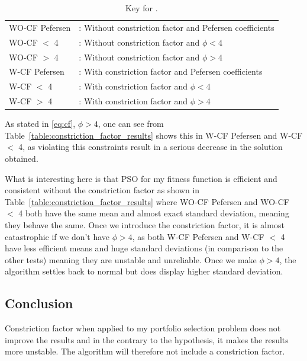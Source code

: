 \documentclass{pdfmx4020}
\begin{document}
        \begin{table}[H]
          \setlength{\extrarowheight}{2.0pt}
          \begin{tabular}{ l l }
            WO-CF Pefersen & : Without constriction factor and Pefersen coefficients  \\
            WO-CF $<$ 4 & : Without constriction factor and $\phi < 4$ \\
            WO-CF $>$ 4 & : Without constriction factor and $\phi > 4$ \\
            W-CF Pefersen & : With constriction factor and Pefersen coefficients  \\
            W-CF $<$ 4 & : With constriction factor and $\phi < 4$ \\
            W-CF $>$ 4 & : With constriction factor and $\phi > 4$ \\
          \end{tabular}
          \caption{Key for .}
          \label{table:key_constriction_factor_results}
        \end{table}

      As stated in \ref{eq:cf}, $\phi > 4$, one can see from Table~\ref{table:constriction_factor_results} shows this in W-CF Pefersen and W-CF $<$ 4, as violating this constraints result in a serious decrease in the solution obtained. 

      What is interesting here is that PSO for my fitness function is efficient and consistent without the constriction factor as shown in Table~\ref{table:constriction_factor_results} where WO-CF Pefersen and WO-CF $<$ 4 both have the same mean and almost exact standard deviation, meaning they behave the same. Once we introduce the constriction factor, it is almost catastrophic if we don't have $\phi > 4$, as both W-CF Pefersen and W-CF $<$ 4 have less efficient means and huge standard deviations (in comparison to the other tests) meaning they are unstable and unreliable. Once we make $\phi > 4$, the algorithm settles back to normal but does display higher standard deviation. 
    \subsection{Conclusion} %
    \label{sub:conclusion}
      Constriction factor when applied to my portfolio selection problem does not improve the results and in the contrary to the hypothesis, it makes the results more unstable. The algorithm will therefore not include a constriction factor. 
\end{document}
